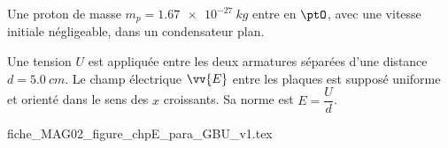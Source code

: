 \hauteurLargeurCadreReponse		{8mm}{3cm}
\typeEntrainement				{} %
\initialisationEntrainement


\debutEntrainement





                                \initialisationPartieGauche %
Une proton  de masse $m_{p}=\SI{1.67e-27}{kg}$ entre en $\ptO$, avec une vitesse initiale négligeable, dans
un condensateur plan. 

Une tension $U$ est appliquée entre les deux armatures séparées d'une
distance $d=\SI{5,0}{cm}$. Le champ électrique $\vv{E}$ entre les
plaques est supposé uniforme et orienté dans le sens des $x$ croissants.
Sa norme est $E=\dfrac{U}{d}$.

                                \initialisationPartieDroite %
\begin{center}
{fiche_MAG02_figure_chpE_para_GBU_v1.tex}
\end{center}
                               \finalisationDuPartageDePage %


